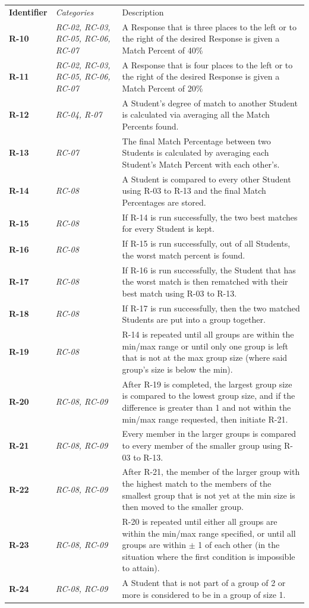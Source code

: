 \documentclass[12pt,letterpaper]{article}
\begin{document}
\begin{center}
    \begin{tabu} to 
	    \tableheader{}Identifier & Categories & Description\\
		
		R-10 & RC-02, RC-03, RC-05, RC-06, RC-07 & A Response that is three places to the left or to the right of the desired Response is given a Match Percent of 40\%\\
		R-11 & RC-02, RC-03, RC-05, RC-06, RC-07 & A Response that is four places to the left or to the right of the desired Response is given a Match Percent of 20\%\\
		R-12 & RC-04, R-07 & A Student's degree of match to another Student is calculated via averaging all the Match Percents found. \\
		R-13 & RC-07 & The final Match Percentage between two Students is calculated by averaging each Student's Match Percent with each other's.\\
		R-14 & RC-08 & A Student is compared to every other Student using R-03 to R-13 and the final Match Percentages are stored.\\
		R-15 & RC-08 & If R-14 is run successfully, the two best matches for every Student is kept.\\
		R-16 & RC-08 & If R-15 is run successfully, out of all Students, the worst match percent is found.\\
		R-17 & RC-08 & If R-16 is run successfully, the Student that has the worst match is then rematched with their best match using R-03 to R-13.\\
		R-18 & RC-08 & If R-17 is run successfully, then the two matched Students are put into a group together.\\
		R-19 & RC-08 & R-14 is repeated until all groups are within the min/max range or until only one group is left that is not at the max group size (where said group's size is below the min).\\
		R-20 & RC-08, RC-09 & After R-19 is completed, the largest group size is compared to the lowest group size, and if the difference is greater than 1 and not within the min/max range requested, then initiate R-21.\\
		R-21 & RC-08, RC-09 & Every member in the larger groups is compared to every member of the smaller group using R-03 to R-13. \\
		R-22 & RC-08, RC-09 & After R-21, the member of the larger group with the highest match to the members of the smallest group that is not yet at the min size is then moved to the smaller group.\\
		R-23 & RC-08, RC-09 & R-20 is repeated until either all groups are within the min/max range specified, or until all groups are within $\pm$ 1 of each other (in the situation where the first condition is impossible to attain).\\
		R-24 & RC-08, RC-09 & A Student that is not part of a group of 2 or more is considered to be in a group of size 1.
    \end{tabu}
\end{center}
\end{document}
